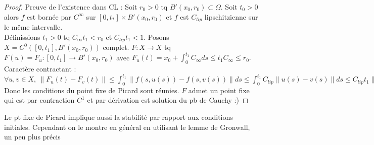 \begin{proof}
    Preuve de l'existence dans CL : Soit $r_0>0$ tq $B'(x_0,r_0)\subset \Omega$. Soit $t_0>0$ alors $f$ est bornée par $C^\infty $ sur $[0,t_*]\times B'(x_0,r_0)$ et $f$ est $C_{lip}$ lipschitzienne sur le même intervalle.\\
    Définissions $t_1>0$ tq $C_\infty t_1<r_0$ et $C_{lip}t_1<1$. Posons $X=C^0([0,t_1],B'(x_0,r_0))$ complet. $F:X\to X$ tq $F(u)=F_u:[0,t_1]\to B'(x_0,r_0)$ avec $F_u(t)=x_0+\int_0^{t_1}C_\infty ds\le t_1C_\infty \le r_0.$ \\
    Caractère contractant : $\forall u,v\in X,\ \|F_u(t)-F_v(t)\|\le \int_0^{t_1} \|f(s,u(s))-f(s,v(s))\|ds\le \int_0^{t_1}C_{lip}\|u(s)-v(s)\|ds\le C_{lip}t_1\|u-v\|_\infty .$ Donc les conditions du point fixe de Picard sont réunies. $F$ admet un point fixe qui est par contraction $C^1$ et par dérivation est solution du pb de Cauchy :)
\end{proof}
\begin{remarque}
    Le pt fixe de Picard implique aussi la stabilité par rapport aux conditions initiales. Cependant on le montre en général en utilisant le lemme de Gronwall, un peu plus précis
\end{remarque}

